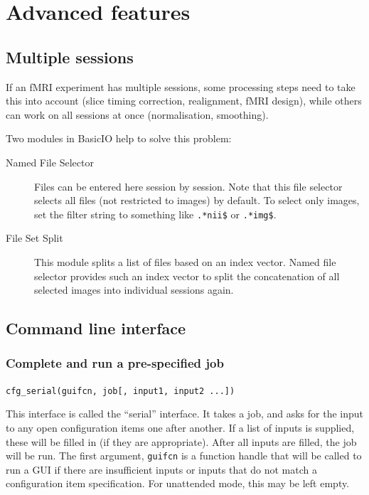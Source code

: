 \section{Advanced features}
\label{sec:batch_interface_advanced}

\subsection{Multiple sessions}

If an fMRI experiment has multiple sessions, some processing steps need to
take this into account (slice timing correction, realignment, fMRI design),
while others can work on all sessions at once (normalisation, smoothing). 

Two modules in BasicIO help to solve this problem:
\begin{description}
\item[Named File Selector] Files can be entered here session by session. Note
  that this file selector selects all files (not restricted to images) by
  default. To select only images, set the filter string to something like
  \verb|.*nii$| or \verb|.*img$|.
\item[File Set Split] This module splits a list of files based on an index
  vector. Named file selector provides such an index vector to split the
  concatenation of all selected images into individual sessions again.
\end{description}

\subsection{Command line interface}
\label{sec:batch_interface_cmd}


\subsubsection{Complete and run a pre-specified job}
\label{sec:batch_interface_cmd_cfg_serial}

\verb|cfg_serial(guifcn, job[, input1, input2 ...])|

This interface is called the ``serial'' interface. It takes a job, and asks
for the input to any open configuration items one after another. If a list of
inputs is supplied, these will be filled in (if they are appropriate). After
all inputs are filled, the job will be run. The first argument, \verb|guifcn|
is a function handle that will be called to run a GUI if there are
insufficient inputs or inputs that do not match a configuration item
specification. For unattended mode, this may be left empty.

